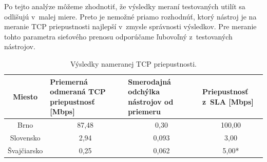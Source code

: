         Po tejto analýze môžeme zhodnotiť, že výsledky meraní testovaných utilít
        sa odlišujú v~malej miere. Preto je nemožné priamo rozhodnúť, ktorý
        nástroj je na meranie TCP priepustnosti najlepší v~zmysle
        správnosti výsledkov. Pre meranie tohto parametra sieťového prenosu 
        odporúčame ľubovoľný z~testovaných nástrojov.

        \begin{table}[h!]
            \begin{center}
                \begin{tabular}{|c|m{4.3cm}|m{4cm}|m{3.4cm}|}
                    \hline
                    Miesto & Priemerná odmeraná TCP priepustnosť [Mbps] &
                    Smerodajná odchýlka nástrojov od priemeru &
                    Priepustnosť z~SLA [Mbps] \\  
                    \hline
                    Brno        &  \multicolumn{1}{c}{87,48} & 
                        \multicolumn{1}{|c|}{0,30} & \multicolumn{1}{c|}{100,00} \\
                    \hline
                    Slovensko   &  \multicolumn{1}{c}{2,94} & 
                        \multicolumn{1}{|c|}{0,093} & \multicolumn{1}{c|}{3,00} \\
                    \hline
                    Švajčiarsko &  \multicolumn{1}{c}{0,25} & 
                        \multicolumn{1}{|c|}{0,062} & \multicolumn{1}{c|}{5,00*}\\
                    \hline
                \end{tabular}
                \caption{Výsledky nameranej TCP priepustnosti.} 
                \label{vys_tcp_priep}
            \end{center}
        \end{table}

